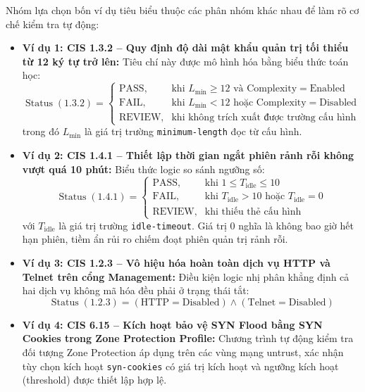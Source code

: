 \documentclass[12pt,a4paper]{article}
\begin{document}
Nhóm lựa chọn bốn ví dụ tiêu biểu thuộc các phân nhóm khác nhau để làm rõ cơ chế kiểm tra tự động:
\begin{itemize}
    \item \textbf{Ví dụ 1: CIS 1.3.2 -- Quy định độ dài mật khẩu quản trị tối thiểu từ 12 ký tự trở lên:}
    Tiêu chí này được mô hình hóa bằng biểu thức toán học:
    \[
    \operatorname{Status}(1.3.2) = 
    \begin{cases} 
    \text{PASS}, & \text{khi } L_{\min} \geq 12 \text{ và } \text{Complexity} = \text{Enabled} \\ 
    \text{FAIL}, & \text{khi } L_{\min} < 12 \text{ hoặc } \text{Complexity} = \text{Disabled} \\ 
    \text{REVIEW}, & \text{khi không trích xuất được trường cấu hình}
    \end{cases}
    \]
    trong đó $L_{\min}$ là giá trị trường \texttt{minimum-length} đọc từ cấu hình.
    \item \textbf{Ví dụ 2: CIS 1.4.1 -- Thiết lập thời gian ngắt phiên rảnh rỗi không vượt quá 10 phút:}
    Biểu thức logic so sánh ngưỡng số:
    \[
    \operatorname{Status}(1.4.1) = 
    \begin{cases} 
    \text{PASS}, & \text{khi } 1 \leq T_{\text{idle}} \leq 10 \\ 
    \text{FAIL}, & \text{khi } T_{\text{idle}} > 10 \text{ hoặc } T_{\text{idle}} = 0 \\ 
    \text{REVIEW}, & \text{khi thiếu thẻ cấu hình}
    \end{cases}
    \]
    với $T_{\text{idle}}$ là giá trị trường \texttt{idle-timeout}. Giá trị 0 nghĩa là không bao giờ hết hạn phiên, tiềm ẩn rủi ro chiếm đoạt phiên quản trị rảnh rỗi.
    \item \textbf{Ví dụ 3: CIS 1.2.3 -- Vô hiệu hóa hoàn toàn dịch vụ HTTP và Telnet trên cổng Management:}
    Điều kiện logic nhị phân khẳng định cả hai dịch vụ không mã hóa đều phải ở trạng thái tắt:
    \[
    \operatorname{Status}(1.2.3) = (\text{HTTP} = \text{Disabled}) \land (\text{Telnet} = \text{Disabled})
    \]
    \item \textbf{Ví dụ 4: CIS 6.15 -- Kích hoạt bảo vệ SYN Flood bằng SYN Cookies trong Zone Protection Profile:}
    Chương trình tự động kiểm tra đối tượng Zone Protection áp dụng trên các vùng mạng untrust, xác nhận tùy chọn kích hoạt \texttt{syn-cookies} có giá trị kích hoạt và ngưỡng kích hoạt (threshold) được thiết lập hợp lệ.
\end{itemize}

\end{document}
